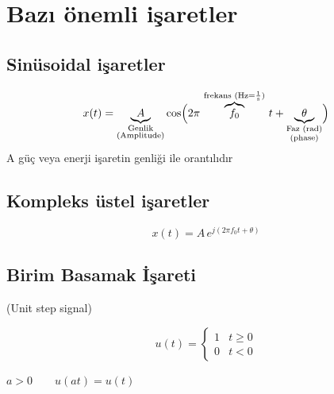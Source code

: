 \documentclass[11pt,a4paper]{article}
\begin{document}
\section{Bazı önemli işaretler}
\subsection{Sinüsoidal işaretler}
\[ x(t)=\underbrace{A}_{\substack{\text{Genlik}\\\text{(Amplitude)}}}\cos\Bigl(2\pi\,\overbrace{f_0}^{\text{frekans }(\mathrm{Hz}=\frac{1}{\mathrm{s}})}\,t+\underbrace{\theta}_{\substack{\text{Faz (rad)}\\\text{(phase)}}}\Bigr) \]
A güç veya enerji işaretin genliği ile orantılıdır

\subsection{Kompleks üstel işaretler}
\[ x(t)=A\,e^{j(2\pi f_0 t+\theta)} \]

\subsection{Birim Basamak İşareti}
(Unit step signal)

\noindent
\begin{minipage}[c]{0.42\linewidth}
  \[ u(t)=\begin{cases} 1 & t\ge 0 \\ 0 & t<0 \end{cases} \]
\end{minipage}\hfill
\begin{minipage}[c]{0.54\linewidth}
  \centering
\end{minipage}

$a>0 \qquad u(at)=u(t)$
\end{document}

